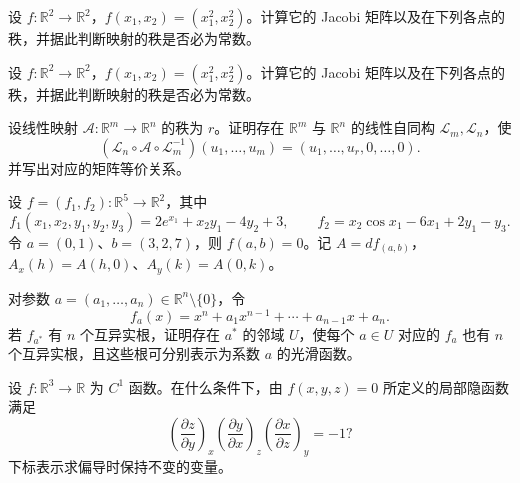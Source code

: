 \newpage
\noindent\begin{minipage}{\textwidth}
设 $f:\mathbb R^2\to\mathbb R^2$，$f(x_1,x_2)=(x_1^2,x_2^2)$。计算它的 Jacobi 矩阵以及在下列各点的秩，并据此判断映射的秩是否必为常数。
\end{minipage}\par\vfill
\noindent\begin{minipage}{\textwidth}
设 $f:\mathbb R^2\to\mathbb R^2$，$f(x_1,x_2)=(x_1^2,x_2^2)$。计算它的 Jacobi 矩阵以及在下列各点的秩，并据此判断映射的秩是否必为常数。
\end{minipage}\par\vfill
\noindent\begin{minipage}{\textwidth}
设线性映射 $\mathcal A:\mathbb R^m\to\mathbb R^n$ 的秩为 $r$。证明存在 $\mathbb R^m$ 与 $\mathbb R^n$ 的线性自同构 $\mathcal L_m,\mathcal L_n$，使\[(\mathcal L_n\circ\mathcal A\circ\mathcal L_m^{-1})(u_1,\ldots,u_m)=(u_1,\ldots,u_r,0,\ldots,0).\]并写出对应的矩阵等价关系。
\end{minipage}\par\vfill
\noindent\begin{minipage}{\textwidth}
设 $f=(f_1,f_2):\mathbb R^5\to\mathbb R^2$，其中\[f_1(x_1,x_2,y_1,y_2,y_3)=2e^{x_1}+x_2y_1-4y_2+3,\qquad f_2=x_2\cos x_1-6x_1+2y_1-y_3.\]令 $a=(0,1)$、$b=(3,2,7)$，则 $f(a,b)=0$。记 $A=df_{(a,b)}$，$A_x(h)=A(h,0)$、$A_y(k)=A(0,k)$。
\end{minipage}\par\vfill
\newpage
\noindent\begin{minipage}{\textwidth}
对参数 $a=(a_1,\ldots,a_n)\in\mathbb R^n\setminus\{0\}$，令\[f_a(x)=x^n+a_1x^{n-1}+\cdots+a_{n-1}x+a_n.\]若 $f_{a^*}$ 有 $n$ 个互异实根，证明存在 $a^*$ 的邻域 $U$，使每个 $a\in U$ 对应的 $f_a$ 也有 $n$ 个互异实根，且这些根可分别表示为系数 $a$ 的光滑函数。
\end{minipage}\par\vfill
\noindent\begin{minipage}{\textwidth}
设 $f:\mathbb R^3\to\mathbb R$ 为 $C^1$ 函数。在什么条件下，由 $f(x,y,z)=0$ 所定义的局部隐函数满足\[\left(\frac{\partial z}{\partial y}\right)_x\left(\frac{\partial y}{\partial x}\right)_z\left(\frac{\partial x}{\partial z}\right)_y=-1?\]下标表示求偏导时保持不变的变量。
\end{minipage}\par\vfill
